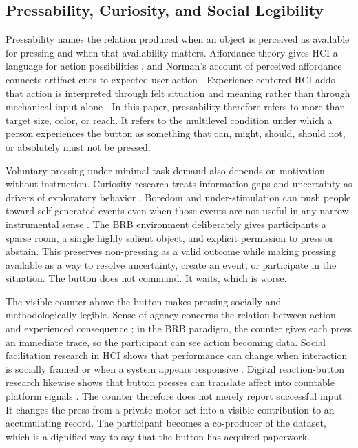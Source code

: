 \subsection{Pressability, Curiosity, and Social Legibility}

Pressability names the relation produced when an object is perceived as available for pressing and when that availability matters. Affordance theory gives HCI a language for action possibilities \citep{Gaver1991}, and Norman's account of perceived affordance connects artifact cues to expected user action \citep{Norman1999}. Experience-centered HCI adds that action is interpreted through felt situation and meaning rather than through mechanical input alone \citep{McCarthyWright2004}. In this paper, pressability therefore refers to more than target size, color, or reach. It refers to the multilevel condition under which a person experiences the button as something that can, might, should, should not, or absolutely must not be pressed.

Voluntary pressing under minimal task demand also depends on motivation without instruction. Curiosity research treats information gaps and uncertainty as drivers of exploratory behavior \citep{KiddHayden2015}. Boredom and under-stimulation can push people toward self-generated events even when those events are not useful in any narrow instrumental sense \citep{Wilson2014}. The BRB environment deliberately gives participants a sparse room, a single highly salient object, and explicit permission to press or abstain. This preserves non-pressing as a valid outcome while making pressing available as a way to resolve uncertainty, create an event, or participate in the situation. The button does not command. It waits, which is worse.

The visible counter above the button makes pressing socially and methodologically legible. Sense of agency concerns the relation between action and experienced consequence \citep{HaggardChambon2012}; in the BRB paradigm, the counter gives each press an immediate trace, so the participant can see action becoming data. Social facilitation research in HCI shows that performance can change when interaction is socially framed or when a system appears responsive \citep{HallHenningsen2008}. Digital reaction-button research likewise shows that button presses can translate affect into countable platform signals \citep{GeboersEtAl2020}. The counter therefore does not merely report successful input. It changes the press from a private motor act into a visible contribution to an accumulating record. The participant becomes a co-producer of the dataset, which is a dignified way to say that the button has acquired paperwork.

